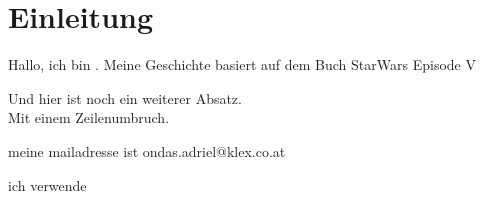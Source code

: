 \chapter{Einleitung}

Hallo, ich bin \@author. Meine Geschichte basiert auf dem Buch StarWars Episode V %

Und hier ist noch ein weiterer Absatz. \\
Mit einem Zeilenumbruch.

meine mailadresse ist ondas.adriel@klex.co.at

ich verwende \cite{ZoteroDownloads}
